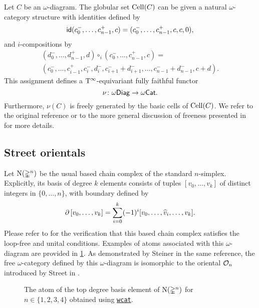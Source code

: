 Let $C$ be an $\omega$-diagram.
The globular set $\mathrm{Cell}(C)$ can be given a natural $\omega$-category structure with
identities defined by
\[
\mathsf{id}(c_0^-, \dots, c_{n-1}^+, c) = (c_0^-, \dots, c_{n-1}^+, c, c, 0),
\]
and $i$-compositions by
\begin{multline*}
	(d_0^-, \dots, d_{n-1}^+, d) \circ_i (c_0^-, \dots, c_{n-1}^+, c) = \\
	(c_0^-, \dots, c_{i-1}^+, c_i^-, d_i^-,  c_{i+1}^- + d_{i+1}^-, \dots, c_{n-1}^- + d_{n-1}^-, c+d).
\end{multline*}
This assignment defines a $\mathrm{T}^\infty$-equivariant fully faithful functor
\[
\nu \colon \omega\mathsf{Diag} \to \omega\mathsf{Cat}.
\]
Furthermore, $\nu(C)$ is freely generated by the basic cells of $\mathrm{Cell}(C)$.
We refer to the original reference \cite{steiner2004omega} or to the more general discussion of freeness presented in \cite{forest2022pasting} for more details.

\subsection{Street orientals}\label{ss:orientals}

Let $\operatorname{N}(\mathbb{\Delta}^n)$ be the usual based chain complex of the standard $n$-simplex.
Explicitly, its basis of degree $k$ elements consists of tuples $[v_0,\dots,v_k]$ of distinct integers in $\{0,\dots,n\}$, with boundary defined by
\[
\partial\, [v_0,\dots,v_k] = \sum_{i=0}^k (-1)^i [v_0,\dots,\widehat{v}_i,\dots,v_k].
\]
Please refer to \cite[Example 3.8]{steiner2004omega} for the verification that this based chain complex satisfies the loop-free and unital conditions.
Examples of atoms associated with this $\omega$-diagram are provided in \cref{f:street}.
As demonstrated by Steiner in the same reference, the free $\omega$-category defined by this $\omega$-diagram is isomorphic to the oriental $\mathcal{O}_n$ introduced by Street in \cite{street1987orientals}.

\begin{figure}
	\centering
	
	\caption{The atom of the top degree basis element of $\operatorname{N}(\mathbb{\Delta}^n)$ for $n \in \{1,2,3,4\}$ obtained using \href{https://github.com/ammedmar/wcat}{\texttt{wcat}}.}
	\label{f:street}
\end{figure}


